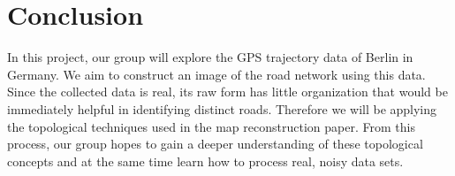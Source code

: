 \documentclass[11pt]{article}
\begin{document}
\section*{Conclusion}
In this project, our group will explore the GPS trajectory data of Berlin in Germany. We aim to construct an image of the road network using this data. Since the collected data is real, its raw form has little organization that would be immediately helpful in identifying distinct roads. Therefore we will be applying the topological techniques used in the map reconstruction paper. From this process, our group hopes to gain a deeper understanding of these topological concepts and at the same time learn how to process real, noisy data sets.

\end{document}
